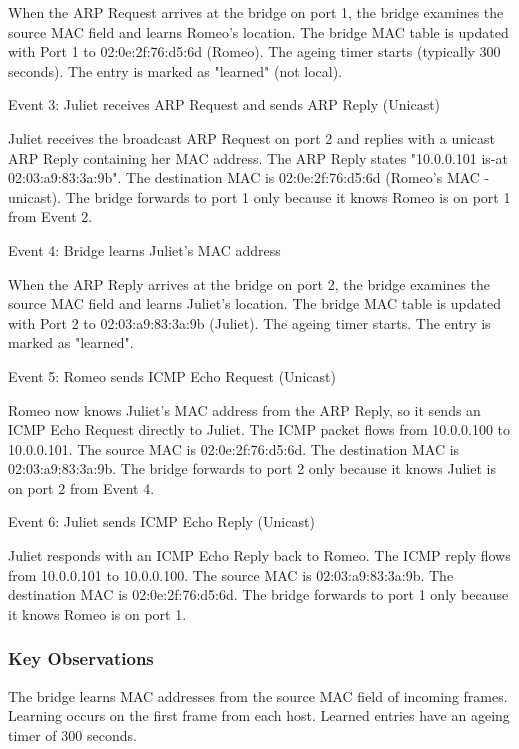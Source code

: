 \documentclass[11pt]{article}
\begin{document}
When the ARP Request arrives at the bridge on port 1, the bridge examines the source MAC field and learns Romeo's location. The bridge MAC table is updated with Port 1 to 02:0e:2f:76:d5:6d (Romeo). The ageing timer starts (typically 300 seconds). The entry is marked as "learned" (not local).

\vspace{0.5cm}
Event 3: Juliet receives ARP Request and sends ARP Reply (Unicast)

Juliet receives the broadcast ARP Request on port 2 and replies with a unicast ARP Reply containing her MAC address. The ARP Reply states "10.0.0.101 is-at 02:03:a9:83:3a:9b". The destination MAC is 02:0e:2f:76:d5:6d (Romeo's MAC - unicast). The bridge forwards to port 1 only because it knows Romeo is on port 1 from Event 2.

\vspace{0.5cm}
Event 4: Bridge learns Juliet's MAC address

When the ARP Reply arrives at the bridge on port 2, the bridge examines the source MAC field and learns Juliet's location. The bridge MAC table is updated with Port 2 to 02:03:a9:83:3a:9b (Juliet). The ageing timer starts. The entry is marked as "learned".

\vspace{0.5cm}
Event 5: Romeo sends ICMP Echo Request (Unicast)

Romeo now knows Juliet's MAC address from the ARP Reply, so it sends an ICMP Echo Request directly to Juliet. The ICMP packet flows from 10.0.0.100 to 10.0.0.101. The source MAC is 02:0e:2f:76:d5:6d. The destination MAC is 02:03:a9:83:3a:9b. The bridge forwards to port 2 only because it knows Juliet is on port 2 from Event 4.

\vspace{0.5cm}
Event 6: Juliet sends ICMP Echo Reply (Unicast)

Juliet responds with an ICMP Echo Reply back to Romeo. The ICMP reply flows from 10.0.0.101 to 10.0.0.100. The source MAC is 02:03:a9:83:3a:9b. The destination MAC is 02:0e:2f:76:d5:6d. The bridge forwards to port 1 only because it knows Romeo is on port 1.

\subsubsection*{Key Observations}

The bridge learns MAC addresses from the source MAC field of incoming frames. Learning occurs on the first frame from each host. Learned entries have an ageing timer of 300 seconds.
\end{document}
